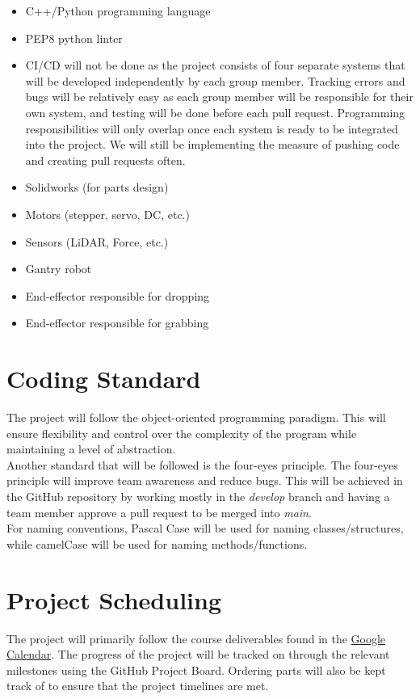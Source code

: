 \documentclass{article}
\begin{document}
	\begin{itemize}
	\item C++/Python programming language
	\item PEP8 python linter
	\item CI/CD will not be done as the project consists of four separate systems that will be developed independently by each group member. Tracking errors and bugs will be relatively 
	easy as each group member will be responsible for their own system, and testing will be done before each pull request. Programming responsibilities will only overlap once each 
	system is ready to be integrated into the project. We will still be implementing the measure of pushing code and creating pull requests often.
	\item Solidworks (for parts design)
	\item Motors (stepper, servo, DC, etc.)
	\item Sensors (LiDAR, Force, etc.)
	\item Gantry robot
	\item End-effector responsible for dropping
	\item End-effector responsible for grabbing
	\end{itemize}
	
	\section{Coding Standard}
	The project will follow the object-oriented programming paradigm. This will ensure flexibility 
	and control over the complexity of the program while maintaining a level of abstraction.\\

	\noindent Another standard that will be followed is the four-eyes principle. The four-eyes principle 
	will improve team awareness and reduce bugs. This will be achieved in the GitHub repository by 
	working mostly in the \emph{develop} branch and having a team member approve a pull request to be merged into \emph{main}.\\

	\noindent For naming conventions, Pascal Case will be used for naming classes/structures, while camelCase will be used for naming methods/functions.

	\section{Project Scheduling}
	The project will primarily follow the course deliverables found in the 
	\href{https://calendar.google.com/calendar/embed?src=rnboqiaki1k2la7rpu3bn0um58%40group.calendar.google.com&ctz=America%2FToronto}{Google Calendar}. 
	The progress of the project will be tracked on through the relevant milestones using the GitHub Project Board. 
	Ordering parts will also be kept track of to ensure that the project timelines are met.\\
\end{document}
